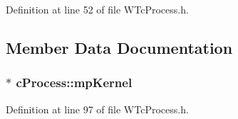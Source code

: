 Definition at line 52 of file WTcProcess.h.



\subsection{Member Data Documentation}
\hypertarget{classc_process_a66009bc1498c7ac90a00731914682d0f}{
\subsubsection[{mpKernel}]{$\ast$ {\bf cProcess::mpKernel}}}
\label{classc_process_a66009bc1498c7ac90a00731914682d0f}


Definition at line 97 of file WTcProcess.h.

